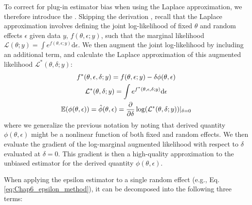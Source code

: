 To correct for plug-in estimator bias when using the Laplace approximation, we therefore introduce the . Skipping the derivation \cite{thorson_implementing_2016,tierney_fully_1989}, recall that the Laplace approximation involves defining the joint log-likelihood of fixed \( \theta \) and random effects \( \epsilon \) given data \(y\), \( f( \theta, \epsilon; y ) \), such that the marginal likelihood \( \mathcal{L}(\theta;y) = \int e^{f(\theta,\epsilon;y)} \mathrm{d}\epsilon \).  We then augment the joint log-likelihood by including an additional term, and calculate the Laplace approximation of this augmented likelihood \(\mathcal{L^*}(\theta, \delta; y)\):
\begin{gather} \label{eq:Chap6_epsilon_method}
    f^*( \theta, \epsilon, \delta; y ) = f( \theta, \epsilon; y ) - \delta \phi(\theta,\epsilon) \\
    \mathcal{L^*}(\theta, \delta; y) = \int e^{f^*(\theta,\epsilon,\delta;y)} \mathrm{d}\epsilon \\
    \E(\phi(\theta,\epsilon)) = \hat \phi(\theta,\epsilon) = \frac{\partial}{\partial \delta} \log(\mathcal{L^*}(\theta, \delta; y))|_{\delta=0}
\end{gather}
where we generalize the previous notation by noting that derived quantity \(\phi(\theta,\epsilon)\) might be a nonlinear function of both fixed and random effects.  We then evaluate the gradient of the log-marginal augmented likelihood with respect to \( \delta \) evaluated at \( \delta=0\). This gradient is then a high-quality approximation to the unbiased estimator for the derived quantity \(\phi(\theta,\epsilon)\).

When applying the epsilon estimator to a single random effect (e.g., Eq. \ref{eq:Chap6_epsilon_method}), it can be decomposed into the following three terms:

